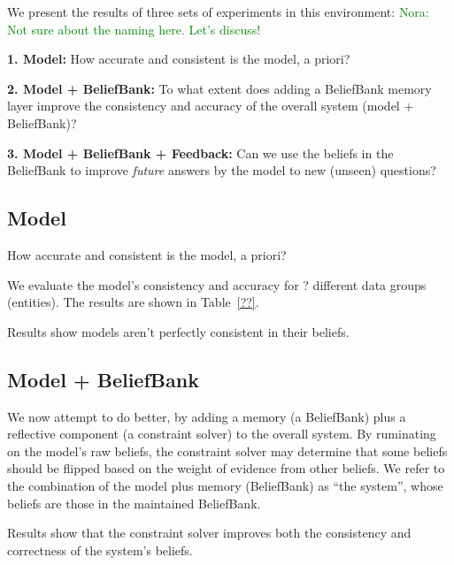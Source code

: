\documentclass[11pt]{article}
\newcommand{\nk}[1]{\textcolor{green}{Nora: #1}}
\newenvironment{enu}{                   %
     \parskip 0cm \begin{list}{}{\parsep 0cm \itemsep 0cm \topsep 0cm}}{
       \end{list}} %
\begin{document}
We present the results of three sets of experiments in this environment:
\nk{Not sure about the naming here. Let's discuss!}
\begin{enu}
\item[\textbf{1. Model:}] How accurate and consistent is the model, a priori?
\item[{\bf 2. Model + BeliefBank:}] To what extent does adding a BeliefBank memory layer improve the consistency and accuracy
           of the overall system (model + BeliefBank)?
\item[{\bf 3. Model + BeliefBank + Feedback:}] Can we use the beliefs in the BeliefBank to improve {\it future} answers by the model
to new (unseen) questions?
\end{enu}


\subsection{Model}

How accurate and consistent is the model, a priori?

We evaluate the model's consistency and accuracy for ? different data groups (entities). The results are shown in Table~\ref{??}.

Results show models aren't perfectly consistent in their beliefs.

\subsection{Model + BeliefBank}


We now attempt to do better, by adding a memory (a BeliefBank) plus a reflective component (a constraint solver)
to the overall system. By ruminating on the model's raw beliefs, the constraint solver may determine
that some beliefs should be flipped based on the weight of evidence from other beliefs. We refer
to the combination of the model plus memory (BeliefBank) as ``the system'', whose beliefs are those
in the maintained BeliefBank.

Results show that the constraint solver improves both the consistency and correctness
of the system's beliefs.
\end{document}
